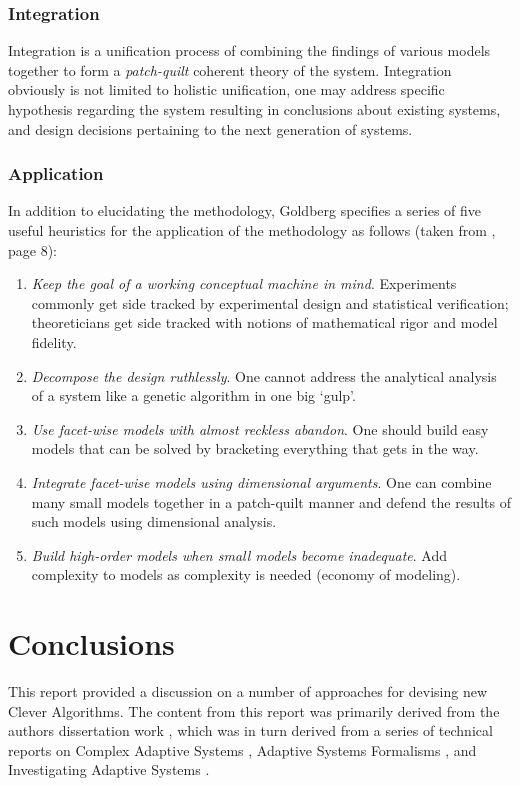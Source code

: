 \documentclass[a4paper, 11pt]{article}
\begin{document}
\subsubsection{Integration} 
Integration is a unification process of combining the findings of various models together to form a \emph{patch-quilt} coherent theory of the system. Integration obviously is not limited to holistic unification, one may address specific hypothesis regarding the system resulting in conclusions about existing systems, and design decisions pertaining to the next generation of systems.

\subsubsection{Application} 
In addition to elucidating the methodology, Goldberg specifies a series of five useful heuristics for the application of the methodology as follows (taken from \cite{Goldberg1999a}, page 8):

\begin{enumerate}
	\item \emph{Keep the goal of a working conceptual machine in mind}. Experiments commonly get side tracked by experimental design and statistical verification; theoreticians get side tracked with notions of mathematical rigor and model fidelity.
	\item \emph{Decompose the design ruthlessly}. One cannot address the analytical analysis of a system like a genetic algorithm in one big `gulp'.
	\item \emph{Use facet-wise models with almost reckless abandon}. One should build easy models that can be solved by bracketing everything that gets in the way.
	\item \emph{Integrate facet-wise models using dimensional arguments}. One can combine many small models together in a patch-quilt manner and defend the results of such models using dimensional analysis.
	\item \emph{Build high-order models when small models become inadequate}. Add complexity to models as complexity is needed (economy of modeling).
\end{enumerate}


% 
% 
\section{Conclusions}
\label{sec:conclusions}
This report provided a discussion on a number of approaches for devising new Clever Algorithms. 
The content from this report was primarily derived from the authors dissertation work \cite{Brownlee2008}, which was in turn derived from a series of technical reports on Complex Adaptive Systems \cite{Brownlee2007c}, Adaptive Systems Formalisms \cite{Brownlee2007d}, and Investigating Adaptive Systems \cite{Brownlee2007e}.




\end{document}

